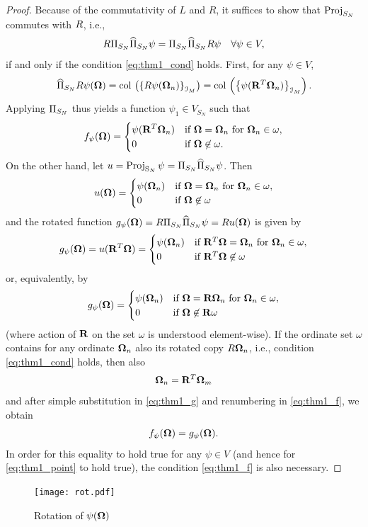 \begin{proof}
Because of the commutativity of $L$ and $R$, it suffices to show that $\Projop[S_N]$ commutes
with $\op{R}$, i.e.,
\begin{equation}\label{eq:thm1_point}
	R \PiSN \PihSN \psi = \PiSN \PihSN R \psi\quad  \forall \psi \in V, 
\end{equation}
if and only if the condition \eqref{eq:thm1_cond} holds. First, for any $\psi\in V$,
\begin{equation*}
	\PihSN R\psi(\bomega) = \colset{R\psi(\bomega_n)}{\idxset{M}} = \colset{\psi(\mat{R}^T\bomega_n)}{\idxset{M}}.
\end{equation*}
Applying $\PiSN$ thus yields a function $\psi_1\in V_{S_N}$ such that
\begin{equation}\label{eq:thm1_f}
f_\psi(\bomega) = \pw{\psi(\mat{R}^T\bomega_n)}{if $\bomega = \bomega_n$ for $\bomega_n\in\omega$}{0}{if $\bomega \not
	\in \omega$.}
\end{equation}
On the other hand, let $u = \Projop[\SN]\psi = \PiSN\PihSN\psi$. Then
$$
u(\bomega) = \pw{\psi(\bomega_n)}{if $\bomega = \bomega_n$ for $\bomega_n\in\omega$}{0}{if $\bomega \not
	\in \omega$}
$$ 
and the rotated function $g_\psi(\bomega) = R\PiSN\PihSN\psi = R u(\bomega)$ is given by
$$
g_\psi(\bomega) = u(\mat{R}^T\bomega) = \pw{\psi(\bomega_n)}{if $\mat{R}^T\bomega = \bomega_n$ for
$\bomega_n\in\omega$}{0}{if $\mat{R}^T\bomega \not \in \omega$}
$$
or, equivalently, by
\begin{equation}\label{eq:thm1_g}
g_\psi(\bomega) = \pw{\psi(\bomega_n)}{if $\bomega = \mat{R}\bomega_n$ for
$\bomega_n\in\omega$}{0}{if $\bomega \not \in \mat{R}\omega$}
\end{equation}
(where action of $\mat{R}$ on the set $\omega$ is understood element-wise). If the ordinate set $\omega$ contains for
any ordinate $\bomega_n$ also its rotated copy $R\bomega_n$, i.e., condition \eqref{eq:thm1_cond} holds, then also
$$
	\bomega_n = \mat{R}^T\bomega_m
$$
and after simple substitution in \eqref{eq:thm1_g} and renumbering in \eqref{eq:thm1_f}, we obtain
$$
	f_\psi(\bomega) = g_\psi(\bomega).
$$
In order for this equality to hold true for any $\psi \in V$ (and hence for \eqref{eq:thm1_point} to hold true), the
condition \eqref{eq:thm1_f} is also necessary.
\end{proof}
\mbox{}\begin{figure}[htp]
\begin{center}
  \texttt{[image: rot.pdf]}
  \caption[Rotation of $\psi(\bomega)$]{Rotation of $\psi(\bomega)$}
  \label{fig:rot}
\end{center}
\end{figure}

